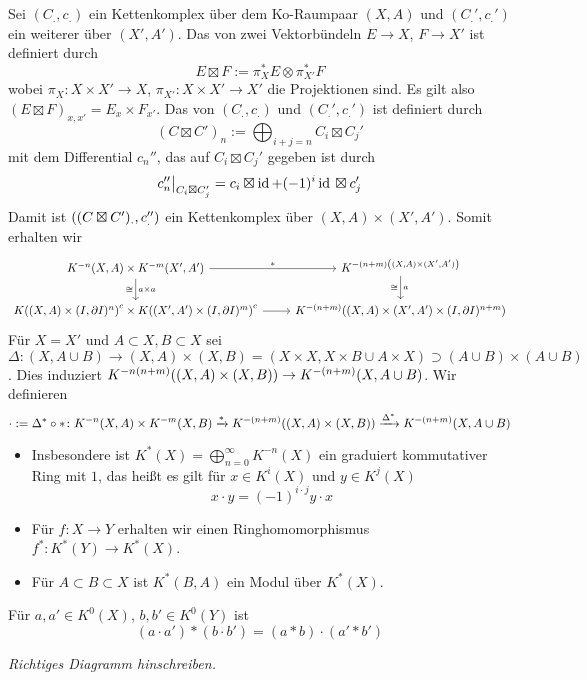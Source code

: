 Sei $(C_.,c_.)$ ein Kettenkomplex über dem Ko-Raumpaar $(X,A)$ und $(C_.',c_.')$ ein weiterer über $(X',A')$. Das  von zwei Vektorbündeln $E \to X$,
$F \to X'$ ist definiert durch 
\[
	E \boxtimes F := \pi_X^* E \otimes \pi_{X'}^* F
\]
wobei $\pi_X \colon X \times X' \to X$, $\pi_{X'} \colon X \times X' \to X'$ die Projektionen sind. Es gilt also $(E \boxtimes F)_{x,x'} = E_x \times F_{x'}$.
Das  von $(C_.,c_.)$ und $(C_.',c_.')$ ist definiert durch 
\[
	(C \boxtimes C')_n := \bigoplus_{i+j=n} C_i \boxtimes C_j'
\]
mit dem Differential $c_n''$, das auf $C_i \boxtimes C_j'$ gegeben ist durch 
\[
	c_n'' \big|_{C_i \boxtimes C_j'} = c_i \boxtimes \id + (-1)^i \id{} \boxtimes c_j'
\]
Damit ist $\enbrace*{(C \boxtimes C')_., c_.''} $ ein Kettenkomplex über $(X,A) \times (X',A')$. Somit erhalten wir 
\[	  
	\begin{tikzcd}
		K^{-n}(X,A) \times K^{-m}(X',A') \dar["a \times a","\cong"'] \rar["*"] & K^{-(n+m) \enbrace*{(X,A) \times (X',A')} } \dar["a","\cong"'] \\
		K \enbrace*{(X,A) \times (I, \partial I)^n}^c \times K \enbrace*{(X',A') \times (I, \partial I)^m}^c \rar &
		K^{-(n+m)} \enbrace*{(X,A) \times (X',A') \times (I,\partial I)^{n+m}}    
	\end{tikzcd}
\]
Für $X=X'$ und $A \subset X, B \subset X$ sei 
$\Delta \colon (X,A \cup B) \to (X,A) \times (X,B)= (X\times X, X \times B \cup A \times X) \supset (A \cup B) \times (A \cup B)$. Dies induziert 
$K^{-n(n+m)} \enbrace*{(X,A) \times (X,B)} \to K^{-(n+m)}(X, A \cup B) $. Wir definieren
\[
	\cdot := \Delta^* \circ * \colon K^{-n}(X,A) \times K^{-m}(X,B) \xrightarrow{*} K^{-(n+m)} \enbrace*{(X,A) \times (X,B)}\xrightarrow{\Delta^*} K^{-(n+m)}(X,A \cup B)   
\]
\begin{itemize}
	\item Insbesondere ist $K^*(X) = \bigoplus_{n=0}^\infty K^{-n}(X)$ ein graduiert kommutativer Ring mit $1$, das heißt es gilt für $x \in K^i(X)$ und $y \in K^j(X)$
	\[
		x \cdot y = (-1)^{i \cdot j} y \cdot x
	\]
	\item Für $f \colon X \to Y$ erhalten wir einen Ringhomomorphismus $f^* \colon K^*(Y) \to K^*(X)$.
	\item Für $A \subset B \subset X$ ist $K^*(B,A)$ ein Modul über $K^*(X)$.
\end{itemize}


\begin{lemma}
Für $a,a' \in K^0(X)$, $b,b' \in K^0(Y)$ ist 
\[
	(a \cdot a') * (b \cdot b') = (a * b) \cdot (a' * b')
\]	
\end{lemma}
\begin{beweis}
\emph{Richtiges Diagramm hinschreiben.}	
\end{beweis}


